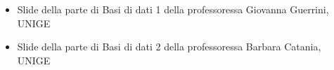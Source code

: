 \begin{itemize}
    \item Slide della parte di Basi di dati 1 della professoressa Giovanna Guerrini, UNIGE
    \item Slide della parte di Basi di dati 2 della professoressa Barbara Catania, UNIGE
\end{itemize}